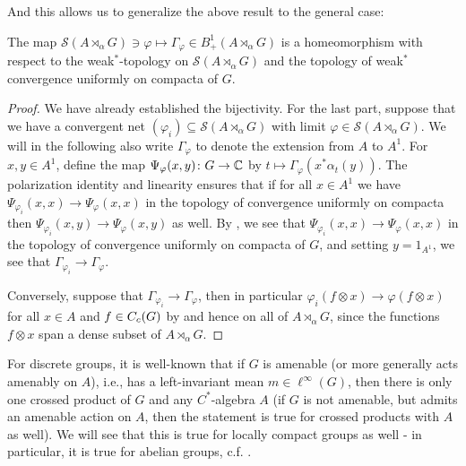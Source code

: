 And this allows us to generalize the above result to the general case:
\begin{proposition}
The map $\mathcal{S}(A \rtimes_\alpha G) \ni \varphi \mapsto \Gamma_\varphi \in B_+^1(A \rtimes_\alpha G)$ is a homeomorphism with respect to the weak$^*$-topology on $\mathcal{S}(A \rtimes_\alpha G)$ and the topology of weak$^*$ convergence uniformly on compacta of $G$.	
\end{proposition}
\begin{proof}
We have already established the bijectivity. For the last part, suppose that we have a convergent net $(\varphi_i) \subseteq \mathcal{S}(A \rtimes _\alpha  G)$	with limit $\varphi \in \mathcal{S}(A \rtimes_\alpha G)$. We will in the following also write $\Gamma_\varphi$ to denote the extension from $A$ to $A^1$. For $x,y \in A^1$, define the map $\Psi_{\varphi}(x,y) \colon G \to \mathbb{C}$ by $t \mapsto \Gamma_\varphi(x^* \alpha_t(y))$. The polarization identity and linearity ensures that if for all $x \in A^1$ we have $\Psi_{\varphi_i}(x,x) \to \Psi_{\varphi}(x,x)$ in the topology of convergence uniformly on compacta then $\Psi_{\varphi_i}(x,y) \to \Psi_{\varphi}(x,y)$ as well. By , we see that $\Psi_{\varphi_i}(x,x) \to \Psi_{\varphi}(x,x)$ in the topology of convergence uniformly on compacta of $G$, and setting $y = 1_{A^1}$, we see that $\Gamma_{\varphi_i} \to \Gamma_\varphi$.

Conversely, suppose that $\Gamma_{\varphi_i} \to \Gamma_{\varphi}$, then in particular $\varphi_{i}(f \otimes x) \to \varphi(f \otimes x)$ for all $x \in A$ and $f \in C_c(G)$ by  and hence on all of $A \rtimes_\alpha G$, since the functions $f \otimes x$ span a dense subset of $A \rtimes_\alpha G$.
\end{proof}

For discrete groups, it is well-known  that if $G$ is amenable (or more generally acts amenably on $A$), i.e., has a left-invariant mean $m \in \ell^\infty(G)$, then there is only one crossed product of $G$ and any $C^*$-algebra $A$ (if $G$ is not amenable, but admits an amenable action on $A$, then the statement is true for crossed products with $A$ as well). We will see that this is true for locally compact groups as well - in particular, it is true for abelian groups, c.f. \cite[appendix G]{bekka2008kazhdan}.

